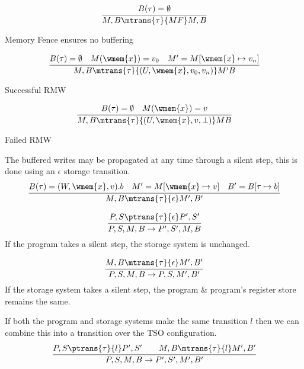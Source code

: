 \\ \begin{minipage}[b]{.33\textwidth}
    \[\cfrac{B(\tau) = \emptyset}{M,B \mtrans{\tau}{MF}M, B}\]
    \centerline{Memory Fence ensures no buffering}
\end{minipage}
\begin{minipage}[b]{.33\textwidth}
    \[\cfrac{
        B(\tau) = \emptyset \quad M(\wmem{x}) = v_0 \quad M' = M[\wmem{x} \mapsto v_n]
    }{
        M, B \mtrans{\tau}{(U, \wmem{x}, v_0, v_n)} M' B
    }\]
    \centerline{Successful RMW}
\end{minipage}
\begin{minipage}[b]{.33\textwidth}
    \[\cfrac{
        B(\tau) = \emptyset \quad M(\wmem{x}) = v
    }{
        M, B \mtrans{\tau}{(U, \wmem{x}, v, \bot)} M B
    }\]
    \centerline{Failed RMW}
\end{minipage}
\vspace{5mm}
The buffered writes may be propagated at any time through a silent step, this is done using an $\epsilon$ storage transition.
\[\cfrac{
    B(\tau) = (W, \wmem{x}, v).b \quad M' = M[\wmem{x} \mapsto v] \quad B' = B[\tau \mapsto b]
}{
    M, B \mtrans{\tau}{\epsilon} M', B'
}\]

\begin{minipage}[b]{.48\textwidth}
    \[\cfrac{
    P, S \ptrans{\tau}{\epsilon} P', S'
    }{
        P, S, M, B \to P', S', M, B
    }\]
    If the program takes a silent step, the storage system is unchanged.
\end{minipage}
\hfill
\vline
\hfill
\begin{minipage}[b]{.45\textwidth}
    \[\cfrac{
        M, B \mtrans{\tau}{\epsilon} M', B'
    }{
        P, S, M, B \to P, S, M', B'
    }\]
    If the storage system takes a silent step, the program \& program's register store remains the same.
\end{minipage}
\vspace{5mm}
If both the program and storage systems make the same transition $l$ then we can combine this into a transition over the TSO configuration.
\[\cfrac{
    P, S \ptrans{\tau}{l} P', S' \qquad M, B \mtrans{\tau}{l} M', B'
}{
    P, S, M, B \to P', S', M', B'
}\]

